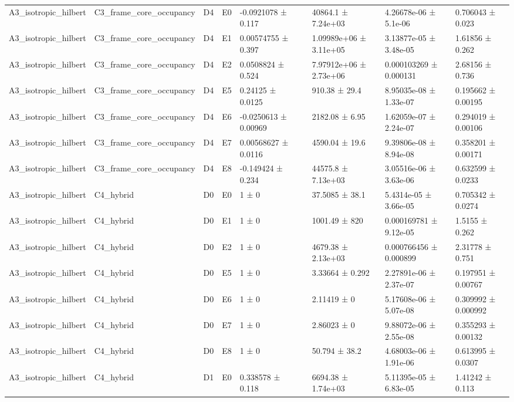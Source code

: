 \begin{table}
\begin{tabular}{lllllllll}
A3\_isotropic\_hilbert & C3\_frame\_core\_occupancy & D4 & E0 & -0.0921078 ± 0.117 &  & 40864.1 ± 7.24e+03 & 4.26678e-06 ± 5.1e-06 & 0.706043 ± 0.023 \\
A3\_isotropic\_hilbert & C3\_frame\_core\_occupancy & D4 & E1 & 0.00574755 ± 0.397 &  & 1.09989e+06 ± 3.11e+05 & 3.13877e-05 ± 3.48e-05 & 1.61856 ± 0.262 \\
A3\_isotropic\_hilbert & C3\_frame\_core\_occupancy & D4 & E2 & 0.0508824 ± 0.524 &  & 7.97912e+06 ± 2.73e+06 & 0.000103269 ± 0.000131 & 2.68156 ± 0.736 \\
A3\_isotropic\_hilbert & C3\_frame\_core\_occupancy & D4 & E5 & 0.24125 ± 0.0125 &  & 910.38 ± 29.4 & 8.95035e-08 ± 1.33e-07 & 0.195662 ± 0.00195 \\
A3\_isotropic\_hilbert & C3\_frame\_core\_occupancy & D4 & E6 & -0.0250613 ± 0.00969 &  & 2182.08 ± 6.95 & 1.62059e-07 ± 2.24e-07 & 0.294019 ± 0.00106 \\
A3\_isotropic\_hilbert & C3\_frame\_core\_occupancy & D4 & E7 & 0.00568627 ± 0.0116 &  & 4590.04 ± 19.6 & 9.39806e-08 ± 8.94e-08 & 0.358201 ± 0.00171 \\
A3\_isotropic\_hilbert & C3\_frame\_core\_occupancy & D4 & E8 & -0.149424 ± 0.234 &  & 44575.8 ± 7.13e+03 & 3.05516e-06 ± 3.63e-06 & 0.632599 ± 0.0233 \\
A3\_isotropic\_hilbert & C4\_hybrid & D0 & E0 & 1 ± 0 &  & 37.5085 ± 38.1 & 5.4314e-05 ± 3.66e-05 & 0.705342 ± 0.0274 \\
A3\_isotropic\_hilbert & C4\_hybrid & D0 & E1 & 1 ± 0 &  & 1001.49 ± 820 & 0.000169781 ± 9.12e-05 & 1.5155 ± 0.262 \\
A3\_isotropic\_hilbert & C4\_hybrid & D0 & E2 & 1 ± 0 &  & 4679.38 ± 2.13e+03 & 0.000766456 ± 0.000899 & 2.31778 ± 0.751 \\
A3\_isotropic\_hilbert & C4\_hybrid & D0 & E5 & 1 ± 0 &  & 3.33664 ± 0.292 & 2.27891e-06 ± 2.37e-07 & 0.197951 ± 0.00767 \\
A3\_isotropic\_hilbert & C4\_hybrid & D0 & E6 & 1 ± 0 &  & 2.11419 ± 0 & 5.17608e-06 ± 5.07e-08 & 0.309992 ± 0.000992 \\
A3\_isotropic\_hilbert & C4\_hybrid & D0 & E7 & 1 ± 0 &  & 2.86023 ± 0 & 9.88072e-06 ± 2.55e-08 & 0.355293 ± 0.00132 \\
A3\_isotropic\_hilbert & C4\_hybrid & D0 & E8 & 1 ± 0 &  & 50.794 ± 38.2 & 4.68003e-06 ± 1.91e-06 & 0.613995 ± 0.0307 \\
A3\_isotropic\_hilbert & C4\_hybrid & D1 & E0 & 0.338578 ± 0.118 &  & 6694.38 ± 1.74e+03 & 5.11395e-05 ± 6.83e-05 & 1.41242 ± 0.113 \\

\end{tabular}
\end{table}
